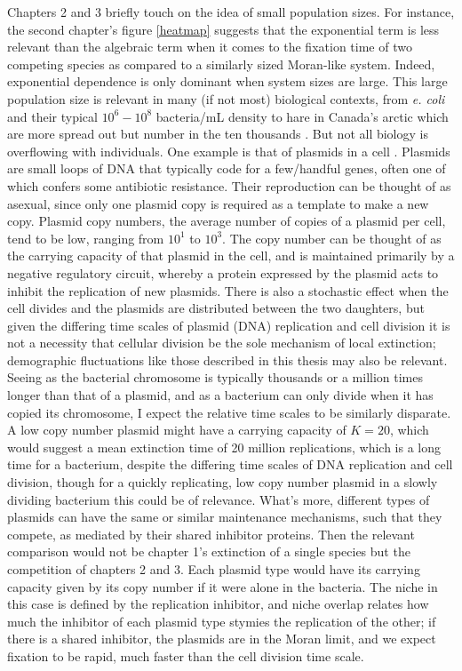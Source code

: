 Chapters 2 and 3 briefly touch on the idea of small population sizes. 
For instance, the second chapter's figure \ref{heatmap} suggests that the exponential term is less relevant than the algebraic term when it comes to the fixation time of two competing species as compared to a similarly sized Moran-like system. 
Indeed, exponential dependence is only dominant when system sizes are large. 
This large population size is relevant in many (if not most) biological contexts, from \emph{e. coli} and their typical $10^6 - 10^8$ bacteria/mL density \cite{Lenski} to hare in Canada's arctic which are more spread out but number in the ten thousands \cite{or whatever}. 
But not all biology is overflowing with individuals. 
One example is that of plasmids in a cell \cite{Ingalls}. 
%
Plasmids are small loops of DNA that typically code for a few/handful genes, often one of which confers some antibiotic resistance. \cite{that bio textbook - Wilson?}
Their reproduction can be thought of as asexual, since only one plasmid copy is required as a template to make a new copy. 
Plasmid copy numbers, the average number of copies of a plasmid per cell, tend to be low, ranging from $10^1$ to $10^3$. 
The copy number can be thought of as the carrying capacity of that plasmid in the cell, and is maintained primarily by a negative regulatory circuit, whereby a protein expressed by the plasmid acts to inhibit the replication of new plasmids. 
There is also a stochastic effect when the cell divides and the plasmids are distributed between the two daughters, but given the differing time scales of plasmid (DNA) replication and cell division it is not a necessity that cellular division be the sole mechanism of local extinction; demographic fluctuations like those described in this thesis may also be relevant. 
Seeing as the bacterial chromosome is typically thousands or a million times longer than that of a plasmid, and as a bacterium can only divide when it has copied its chromosome, I expect the relative time scales to be similarly disparate. 
A low copy number plasmid might have a carrying capacity of $K=20$, which would suggest a mean extinction time of 20 million replications, which is a long time for a bacterium, despite the differing time scales of DNA replication and cell division, though for a quickly replicating, low copy number plasmid in a slowly dividing bacterium this could be of relevance. 
What's more, different types of plasmids can have the same or similar maintenance mechanisms, such that they compete, as mediated by their shared inhibitor proteins. 
Then the relevant comparison would not be chapter 1's extinction of a single species but the competition of chapters 2 and 3. 
Each plasmid type would have its carrying capacity given by its copy number if it were alone in the bacteria. 
The niche in this case is defined by the replication inhibitor, and niche overlap relates how much the inhibitor of each plasmid type stymies the replication of the other; if there is a shared inhibitor, the plasmids are in the Moran limit, and we expect fixation to be rapid, much faster than the cell division time scale. 

